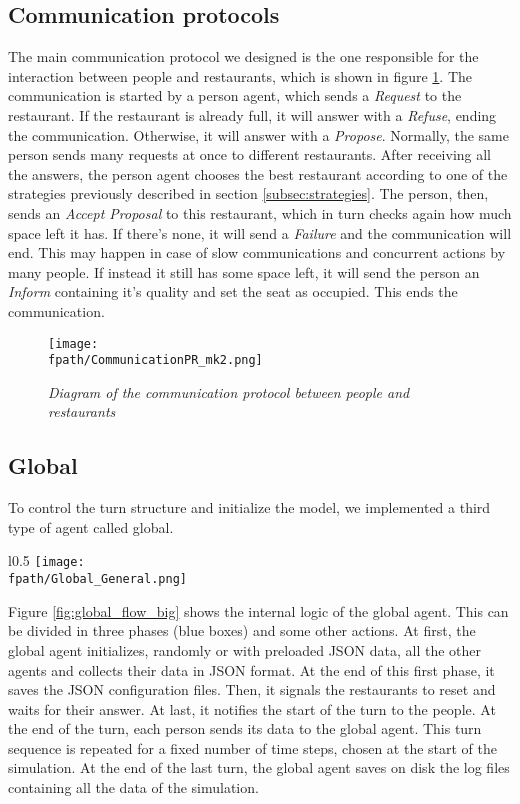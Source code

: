 \documentclass[10pt,a4paper,usenatbib]{article}
\newcommand{\fpath}{./Figs/}
\begin{document}
\subsection{Communication protocols}
\label{subsec:comm_protocol}
The main communication protocol we designed is the one responsible for the interaction between people and restaurants, which is shown in figure \ref{fig:comm_protocol}. The communication is started by a person agent, which sends a \textit{Request} to the restaurant. If the restaurant is already full, it will answer with a \textit{Refuse}, ending the communication. Otherwise, it will answer with a \textit{Propose}. Normally, the same person sends many requests at once to different restaurants. After receiving all the answers, the person agent chooses the best restaurant according to one of the strategies previously described in section \ref{subsec:strategies}. The person, then, sends an \textit{Accept Proposal} to this restaurant, which in turn checks again how much space left it has. If there's none, it will send a \textit{Failure} and the communication will end. This may happen in case of slow communications and concurrent actions by many people. If instead it still has some space left, it will send the person an \textit{Inform} containing it's quality and set the seat as occupied. This ends the communication. 
\begin{figure}
\texttt{[image: \\fpath/CommunicationPR\_mk2.png]}
\caption{\small \textit{Diagram of the communication protocol between people and restaurants}}
\label{fig:comm_protocol}
\end{figure}

\pagebreak

\subsection{Global}
\label{subsec:global}
To control the turn structure and initialize the model, we implemented a third type of agent called global. 

\begin{wrapfigure}{l}{0.5\textwidth}
\centering
\texttt{[image: \\fpath/Global\_General.png]}
\caption{\small \textit{Diagram of the internal logic of the Global class}}
\label{fig:global_flow_big}
\end{wrapfigure}

Figure \ref{fig:global_flow_big} shows the internal logic of the global agent. This can be divided in three phases (blue boxes) and some other actions. At first, the global agent initializes, randomly or with preloaded JSON data, all the other agents and collects their data in JSON format. At the end of this first phase, it saves the JSON configuration files. Then, it signals the restaurants to reset and waits for their answer. At last, it notifies the start of the turn to the people. At the end of the turn, each person sends its data to the global agent. This turn sequence is repeated for a fixed number of time steps, chosen at the start of the simulation.
At the end of the last turn, the global agent saves on disk the log files containing all the data of the simulation.
\end{document}
